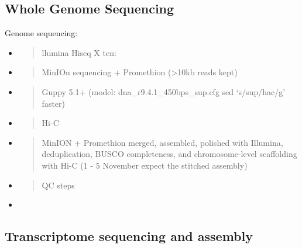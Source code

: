 \hypertarget{whole-genome-sequencing}{%
\subsection{Whole Genome Sequencing}\label{whole-genome-sequencing}}

Genome sequencing:

\begin{itemize}
\item
  \begin{quote}
  llumina Hiseq X ten:
  \end{quote}
\item
  \begin{quote}
  MinIOn sequencing + Promethion (\textgreater10kb reads kept)
  \end{quote}
\item
  \begin{quote}
  Guppy 5.1+ (model: dna\_r9.4.1\_450bps\_sup.cfg \textbar{} sed
  `s/sup/hac/g' faster)
  \end{quote}
\item
  \begin{quote}
  Hi-C
  \end{quote}
\item
  \begin{quote}
  MinION + Promethion merged, assembled, polished with Illumina,
  deduplication, BUSCO completeness, and chromosome-level scaffolding
  with Hi-C (1 - 5 November expect the stitched assembly)
  \end{quote}
\item
  \begin{quote}
  QC steps
  \end{quote}
\item
\end{itemize}

\hypertarget{transcriptome-sequencing-and-assembly}{%
\subsection{Transcriptome sequencing and
assembly}\label{transcriptome-sequencing-and-assembly}}


